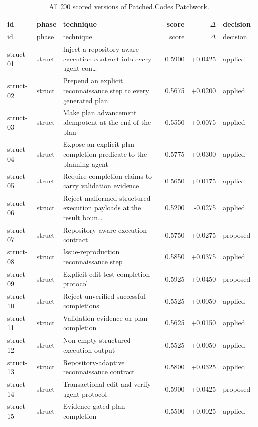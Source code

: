 \begin{center}\scriptsize\begin{longtable}{llp{5.2cm}rrl}
\caption{All 200 scored versions of Patched.Codes Patchwork.}\\
\toprule id & phase & technique & score & $\Delta$ & decision \\ \midrule \endfirsthead
\toprule id & phase & technique & score & $\Delta$ & decision \\ \midrule \endhead
struct-01 & struct & Inject a repository-aware execution contract into every agent con\ldots{} & 0.5900 & +0.0425 & applied \\
struct-02 & struct & Prepend an explicit reconnaissance step to every generated plan & 0.5675 & +0.0200 & applied \\
struct-03 & struct & Make plan advancement idempotent at the end of the plan & 0.5550 & +0.0075 & applied \\
struct-04 & struct & Expose an explicit plan-completion predicate to the planning agent & 0.5775 & +0.0300 & applied \\
struct-05 & struct & Require completion claims to carry validation evidence & 0.5650 & +0.0175 & applied \\
struct-06 & struct & Reject malformed structured execution payloads at the result boun\ldots{} & 0.5200 & -0.0275 & applied \\
struct-07 & struct & Repository-aware execution contract & 0.5750 & +0.0275 & proposed \\
struct-08 & struct & Issue-reproduction reconnaissance step & 0.5850 & +0.0375 & applied \\
struct-09 & struct & Explicit edit-test-completion protocol & 0.5925 & +0.0450 & proposed \\
struct-10 & struct & Reject unverified successful completions & 0.5525 & +0.0050 & applied \\
struct-11 & struct & Validation evidence on plan completion & 0.5625 & +0.0150 & applied \\
struct-12 & struct & Non-empty structured execution output & 0.5525 & +0.0050 & applied \\
struct-13 & struct & Repository-adaptive reconnaissance contract & 0.5800 & +0.0325 & applied \\
struct-14 & struct & Transactional edit-and-verify agent protocol & 0.5900 & +0.0425 & proposed \\
struct-15 & struct & Evidence-gated plan completion & 0.5500 & +0.0025 & applied \\

\end{longtable}
\end{center}
